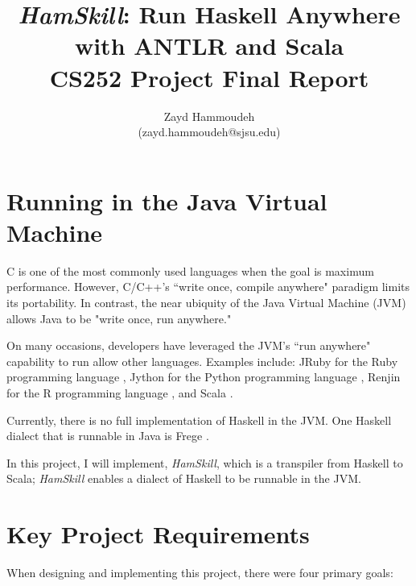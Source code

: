 \documentclass{report}
\title{\emph{HamSkill}: Run Haskell Anywhere \\
with ANTLR and Scala\\[1in]
	   CS252 Project Final Report}
\author{
  Zayd Hammoudeh \\
  (zayd.hammoudeh@sjsu.edu)
  }
\begin{document}
\maketitle

\tableofcontents{\protect\newpage}

\renewcommand\thesection{\arabic{section}}
\section{Running in the Java Virtual Machine}\label{sec:jvm}

C is one of the most commonly used languages when the goal is maximum performance.  However, C/C++'s ``write once, compile anywhere" paradigm limits its portability.  In contrast, the near ubiquity of the Java Virtual Machine (JVM) allows Java to be "write once, run anywhere."  

On many occasions, developers have leveraged the JVM's ``run anywhere" capability to run allow other languages.  Examples include: JRuby for the Ruby programming language \cite{jruby}, Jython for the Python programming language \cite{jython_jvm}, Renjin for the R programming language \cite{renjin}, and Scala \cite{scala}.

Currently, there is no full implementation of Haskell in the JVM.  One Haskell dialect that is runnable in Java is Frege \cite{frege}.  

In this project, I will implement, \emph{HamSkill}, which is a transpiler from Haskell to Scala; \emph{HamSkill} enables a dialect of Haskell to be runnable in the JVM.  

\section{Key Project Requirements}\label{sec:keyProjectRequirements}

When designing and implementing this project, there were four primary goals:
\end{document}
